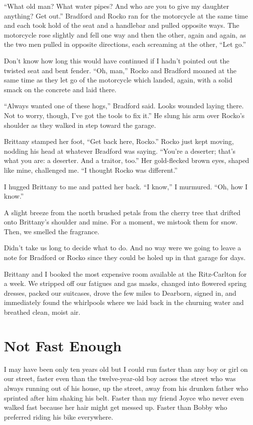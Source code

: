 \documentclass[twoside,10pt]{book}
\begin{document}
``What old man? What water pipes? And who are you to give my daughter
anything? Get out.'' Bradford and Rocko ran for the motorcycle at the
same time and each took hold of the seat and a handlebar and pulled
opposite ways. The motorcycle rose slightly and fell one way and then
the other, again and again, as the two men pulled in opposite
directions, each screaming at the other, ``Let go.''

Don't know how long this would have continued if I hadn't pointed out
the twisted seat and bent fender. ``Oh, man,'' Rocko and Bradford moaned
at the same time as they let go of the motorcy­cle which landed, again,
with a solid smack on the concrete and laid there.

``Always wanted one of these hogs,'' Bradford said. Looks wounded laying
there. Not to worry, though, I've got the tools to fix it.'' He slung
his arm over Rocko's shoulder as they walked in step toward the garage.

Brittany stamped her foot, ``Get back here, Rocko.'' Rocko just kept
moving, nodding his head at whatever Bradford was saying. ``You're a
deserter; that's what you are: a deserter. And a traitor, too.'' Her
gold-flecked brown eyes, shaped like mine, challenged me. ``I thought
Rocko was different.''

I hugged Brittany to me and patted her back. ``I know,'' I murmured.
``Oh, how I know.''

A slight breeze from the north brushed petals from the cherry tree that
drifted onto Brittany's shoulder and mine. For a moment, we mistook them
for snow. Then, we smelled the fragrance.

Didn't take us long to decide what to do. And no way were we going to
leave a note for Bradford or Rocko since they could be holed up in that
garage for days.

Brittany and I booked the most expensive room available at the
Ritz-Carlton for a week. We stripped off our fatigues and gas masks,
changed into flowered spring dresses, packed our suitcases, drove the
few miles to Dearborn, signed in, and immediately found the whirlpools
where we laid back in the churning water and breathed clean, moist air.



\cleardoublepage
\chapter{Not Fast Enough}

I may have been only ten years old but I could run faster than any boy
or girl on our street, faster even than the twelve-year-old boy across
the street who was always running out of his house, up the street, away
from his drunken father who sprinted after him shaking his belt. Faster
than my friend Joyce who never even walked fast because her hair might
get messed up. Faster than Bobby who preferred riding his bike
everywhere.
\end{document}
